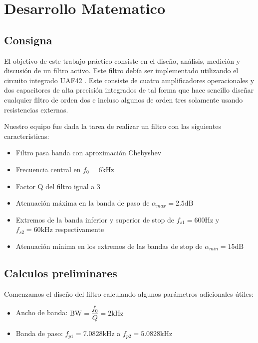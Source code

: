 \documentclass[11pt,a4paper]{report}
\begin{document}
\tableofcontents



\chapter{Desarrollo Matematico}
\section{Consigna} 


El objetivo de este trabajo práctico consiste en el diseño, análisis, medición y discusión de un filtro activo. Este filtro debía ser implementado utilizando el circuito integrado UAF42 \cite{uaf42}. Este consiste de cuatro amplificadores operacionales y dos capacitores de alta precisión integrados de tal forma que hace sencillo diseñar cualquier filtro de orden dos e incluso algunos de orden tres solamente usando resistencias externas.

Nuestro equipo fue dada la tarea de realizar un filtro con las siguientes características:

\begin{itemize}
  \item Filtro pasa banda con aproximación Chebyshev
  \item Frecuencia central en $f_0=6 \mathrm{kHz}$
  \item Factor Q del filtro igual a 3
  \item Atenuación máxima en la banda de paso de $\alpha_{max} = 2.5 \mathrm{dB}$
  \item Extremos de la banda inferior y superior de stop de $f_{s1} = 600 \mathrm{Hz}$ y $f_{s2} = 60 \mathrm{kHz}$ respectivamente
  \item Atenuación mínima en los extremos de las bandas de stop de $\alpha_{min} = 15 \mathrm{dB}$
\end{itemize}

\section{Calculos preliminares}

Comenzamos el diseño del filtro calculando algunos parámetros adicionales útiles:

\begin{itemize}
    \item Ancho de banda: $\mathrm{BW} = \dfrac{f_0}{Q} = 2\mathrm{kHz}$
    \item Banda de paso: $f_{p1} = 7.0828\mathrm{kHz}$  \hspace{10pt} a \hspace{10pt} $f_{p2} = 5.0828\mathrm{kHz}$
\end{itemize}
\end{document}

